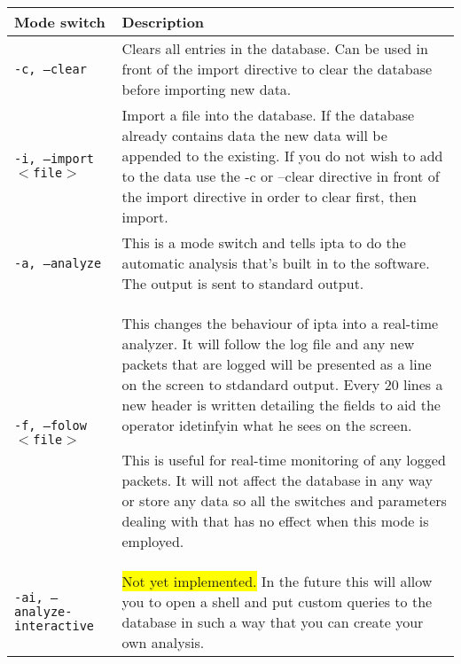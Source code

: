 \documentclass[english,twoside,openright,a4paper,12pt]{article}
\newcommand{\hilight}[1]{\colorbox{yellow}{#1}}
\begin{document}
\scriptsize
\begin{longtable}{|p{}|p{}|}
\hline
\textbf{Mode switch}& \textbf{Description}\\\hline

\texttt{-c, --clear} & 

Clears all entries in the database. Can be used in front of the import
directive to clear the database before importing new data.\\\hline

\texttt{-i, --import $<$file$>$} & 

Import a file into the database. If the database already contains data
the new data will be appended to the existing. If you do not wish to
add to the data use the -c or --clear directive in front of the import
directive in order to clear first, then import.\\\hline

\texttt{-a, --analyze} &  

This is a mode switch and tells ipta to do the automatic analysis
that's built in to the software. The output is sent to standard
output. \\\hline

\texttt{-f, --folow $<$file$>$} & 

This changes the behaviour of ipta into a real-time analyzer. It will
follow the log file and any new packets that are logged will be
presented as a line on the screen to stdandard output. Every 20 lines
a new header is written detailing the fields to aid the operator
idetinfyin what he sees on the screen.

This is useful for real-time monitoring of any logged packets. It will
not affect the database in any way or store any data so all the switches and 
parameters dealing with that has no effect when this mode
is employed.\\\hline

\texttt{-ai, --analyze-interactive} & \hilight{Not yet implemented.}
In the future this will allow you to open a shell and put custom
queries to the database in such a way that you can create your own
analysis.\\\hline

\end{longtable}
\end{document}
